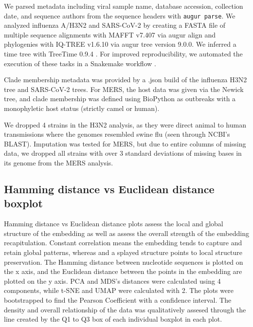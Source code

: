 \documentclass[10pt,letterpaper]{article}
\begin{document}
We parsed metadata including viral sample name, database accession, collection date, and sequence authors from the sequence headers with \texttt{augur parse}.
We analyzed influenza A/H3N2 and SARS-CoV-2 by creating a FASTA file of multiple sequence alignments with MAFFT v7.407 \cite{Katoh2002} via augur align \cite{Hadfield2018} and phylogenies with IQ-TREE v1.6.10 \cite{Nguyen2014} via augur tree version 9.0.0.
We inferred a time tree with TreeTime 0.9.4 \cite{Sagulenko2018}.
For improved reproducibility, we automated the execution of these tasks in a Snakemake workflow \cite{molder_2021}.

Clade membership metadata was provided by a .json build of the influenza H3N2 tree and SARS-CoV-2 trees.
For MERS, the host data was given via the Newick tree, and clade membership was defined using BioPython as outbreaks with a monophyletic host status (strictly camel or human).

We dropped 4 strains in the H3N2 analysis, as they were direct animal to human transmissions where the genomes resembled swine flu (seen through NCBI's BLAST).
Imputation was tested for MERS, but due to entire columns of missing data, we dropped all strains with over 3 standard deviations of missing bases in its genome from the MERS analysis.

\subsection*{Hamming distance vs Euclidean distance boxplot}

Hamming distance vs Euclidean distance plots assess the local and global structure of the embedding as well as assess the overall strength of the embedding recapitulation.
Constant correlation means the embedding tends to capture and retain global patterns, whereas and a splayed structure points to local structure preservation.
The Hamming distance between nucleotide sequences is plotted on the x axis, and the Euclidean distance between the points in the embedding are plotted on the y axis.
PCA and MDS's distances were calculated using 4 components, while t-SNE and UMAP were calculated with 2.
The plots were bootstrapped to find the Pearson Coefficient with a confidence interval.
The density and overall relationship of the data was qualitatively assesed through the line created by the Q1 to Q3 box of each individual boxplot in each plot.
\end{document}
